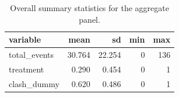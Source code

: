 \begin{table}

\caption{\label{tab:summary_all}Overall summary statistics for the aggregate panel.}
\centering
\begin{tabular}[t]{lrrrr}
\toprule
variable & mean & sd & min & max\\
\midrule
total\_events & 30.764 & 22.254 & 0 & 136\\
treatment & 0.290 & 0.454 & 0 & 1\\
clash\_dummy & 0.620 & 0.486 & 0 & 1\\
\bottomrule
\end{tabular}
\end{table}
